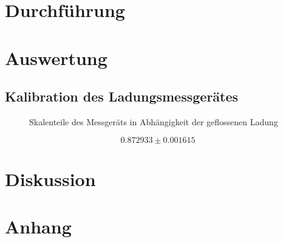 \documentclass[12pt,a4paper,titlepage,headinclude,bibtotoc]{scrartcl}
\begin{document}
\section{Durchführung}
\label{sec:durchfuehrung}

\section{Auswertung}
\label{sec:auswertung}
\subsection{Kalibration des Ladungsmessgerätes}
\begin{figure}
 \centering
 
 \caption{Skalenteile des Messgeräts in Abhängigkeit der geflossenen Ladung}
 \label{fig:Kalibration}
\end{figure}

$$0.872933 \pm 0.001615 $$

\section{Diskussion}
\label{sec:diskussion}

\section{Anhang}
\end{document}
